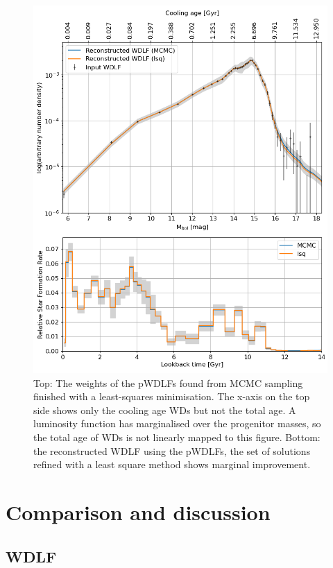 \documentclass[fleqn,usenatbib]{mnras}
\begin{document}
\begin{figure}
    \includegraphics[width=\textwidth]{figures/fig_05_gcns_reconstructed_wdlf_optimal_resolution_bin_optimal.png}
    \caption{Top: The weights of the pWDLFs found from MCMC sampling finished
    with a least-squares minimisation. The x-axis on the top side shows only
    the cooling age WDs but not the total age. A luminosity function has
    marginalised over the progenitor masses, so the total age of WDs is not
    linearly mapped to this figure. Bottom: the reconstructed WDLF using the
    pWDLFs, the set of solutions refined with a least square method shows
    marginal improvement.}
    \label{fig:sfh_mag_bin_05}
\end{figure}


\section{Comparison and discussion}
\subsection{WDLF}
\citet{2013MNRAS.434.1549R}
\end{document}
